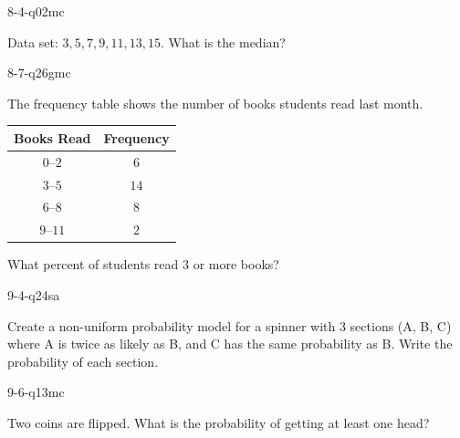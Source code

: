 \begin{practiceQuestion}{8-4-q02}{mc}
\begin{questionText}
Data set: $3, 5, 7, 9, 11, 13, 15$. What is the median?
\end{questionText}
\end{practiceQuestion}

\begin{practiceQuestion}{8-7-q26}{gmc}
\begin{questionText}
The frequency table shows the number of books students read last month.

\begin{center}
\begin{tabular}{|c|c|}
\hline
\textbf{Books Read} & \textbf{Frequency} \\
\hline
$0$--$2$ & $6$ \\
\hline
$3$--$5$ & $14$ \\
\hline
$6$--$8$ & $8$ \\
\hline
$9$--$11$ & $2$ \\
\hline
\end{tabular}
\end{center}

What percent of students read $3$ or more books?
\end{questionText}
\end{practiceQuestion}

\begin{practiceQuestion}{9-4-q24}{sa}
\begin{questionText}
Create a non-uniform probability model for a spinner with $3$ sections (A, B, C) where A is twice as likely as B, and C has the same probability as B. Write the probability of each section.
\end{questionText}
\end{practiceQuestion}

\begin{practiceQuestion}{9-6-q13}{mc}
\begin{questionText}
Two coins are flipped. What is the probability of getting at least one head?
\end{questionText}
\end{practiceQuestion}

